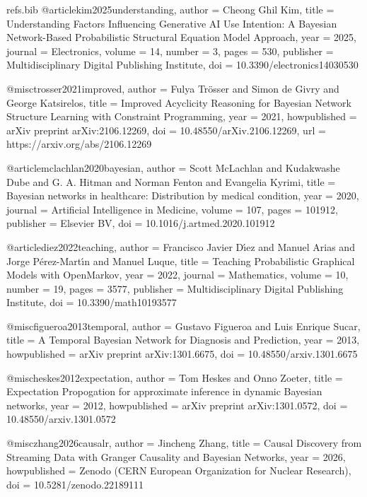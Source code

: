 \begin{filecontents*}[overwrite]{refs.bib}
@article{kim2025understanding,
  author = {Cheong Ghil Kim},
  title = {{Understanding Factors Influencing Generative AI Use Intention: A Bayesian Network-Based Probabilistic Structural Equation Model Approach}},
  year = {2025},
  journal = {Electronics},
  volume = {14},
  number = {3},
  pages = {530},
  publisher = {Multidisciplinary Digital Publishing Institute},
  doi = {10.3390/electronics14030530}
}

@misc{trosser2021improved,
  author = {Fulya Tr{\"o}sser and Simon de Givry and George Katsirelos},
  title = {{Improved Acyclicity Reasoning for Bayesian Network Structure Learning with Constraint Programming}},
  year = {2021},
  howpublished = {arXiv preprint arXiv:2106.12269},
  doi = {10.48550/arXiv.2106.12269},
  url = {https://arxiv.org/abs/2106.12269}
}

@article{mclachlan2020bayesian,
  author = {Scott McLachlan and Kudakwashe Dube and G. A. Hitman and Norman Fenton and Evangelia Kyrimi},
  title = {{Bayesian networks in healthcare: Distribution by medical condition}},
  year = {2020},
  journal = {Artificial Intelligence in Medicine},
  volume = {107},
  pages = {101912},
  publisher = {Elsevier BV},
  doi = {10.1016/j.artmed.2020.101912}
}

@article{diez2022teaching,
  author = {Francisco Javier D{\'\i}ez and Manuel Arias and Jorge P{\'e}rez{-}Mart{\'\i}n and Manuel Luque},
  title = {{Teaching Probabilistic Graphical Models with OpenMarkov}},
  year = {2022},
  journal = {Mathematics},
  volume = {10},
  number = {19},
  pages = {3577},
  publisher = {Multidisciplinary Digital Publishing Institute},
  doi = {10.3390/math10193577}
}

@misc{figueroa2013temporal,
  author = {Gustavo Figueroa and Luis Enrique Sucar},
  title = {{A Temporal Bayesian Network for Diagnosis and Prediction}},
  year = {2013},
  howpublished = {arXiv preprint arXiv:1301.6675},
  doi = {10.48550/arxiv.1301.6675}
}

@misc{heskes2012expectation,
  author = {Tom Heskes and Onno Zoeter},
  title = {{Expectation Propogation for approximate inference in dynamic Bayesian networks}},
  year = {2012},
  howpublished = {arXiv preprint arXiv:1301.0572},
  doi = {10.48550/arxiv.1301.0572}
}

@misc{zhang2026causalr,
  author = {Jincheng Zhang},
  title = {{Causal Discovery from Streaming Data with Granger Causality and Bayesian Networks}},
  year = {2026},
  howpublished = {Zenodo (CERN European Organization for Nuclear Research)},
  doi = {10.5281/zenodo.22189111}
}


\end{filecontents*}
